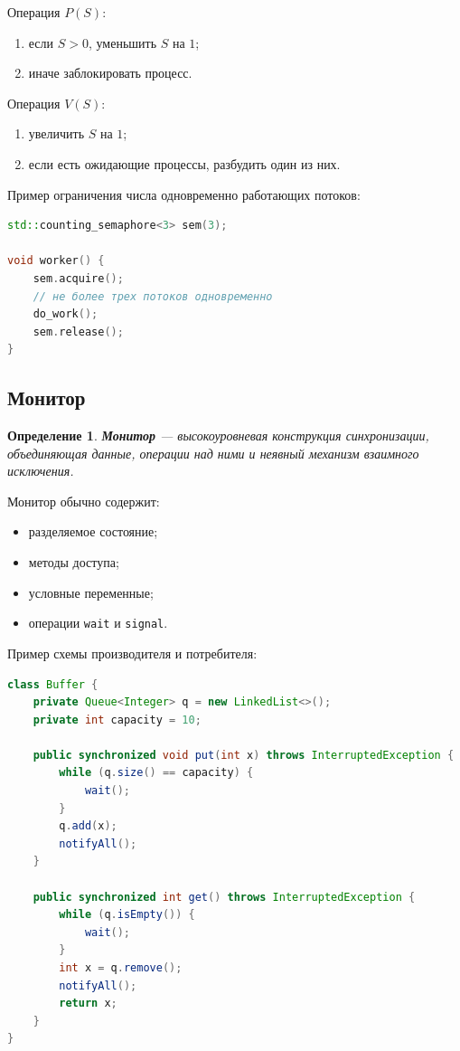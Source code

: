 \documentclass[12pt,a4paper]{article}
\newtheorem{definition}{Определение}
\begin{document}
Операция $P(S)$:
\begin{enumerate}
    \item если $S > 0$, уменьшить $S$ на $1$;
    \item иначе заблокировать процесс.
\end{enumerate}

Операция $V(S)$:
\begin{enumerate}
    \item увеличить $S$ на $1$;
    \item если есть ожидающие процессы, разбудить один из них.
\end{enumerate}

Пример ограничения числа одновременно работающих потоков:

\begin{lstlisting}[language=C++]
std::counting_semaphore<3> sem(3);

void worker() {
    sem.acquire();
    // не более трех потоков одновременно
    do_work();
    sem.release();
}
\end{lstlisting}

\subsection{Монитор}

\begin{definition}
\textbf{Монитор} --- высокоуровневая конструкция синхронизации, объединяющая данные, операции над ними и неявный механизм взаимного исключения.
\end{definition}

Монитор обычно содержит:
\begin{itemize}
    \item разделяемое состояние;
    \item методы доступа;
    \item условные переменные;
    \item операции \texttt{wait} и \texttt{signal}.
\end{itemize}

Пример схемы производителя и потребителя:

\begin{lstlisting}[language=Java]
class Buffer {
    private Queue<Integer> q = new LinkedList<>();
    private int capacity = 10;

    public synchronized void put(int x) throws InterruptedException {
        while (q.size() == capacity) {
            wait();
        }
        q.add(x);
        notifyAll();
    }

    public synchronized int get() throws InterruptedException {
        while (q.isEmpty()) {
            wait();
        }
        int x = q.remove();
        notifyAll();
        return x;
    }
}
\end{lstlisting}
\end{document}
